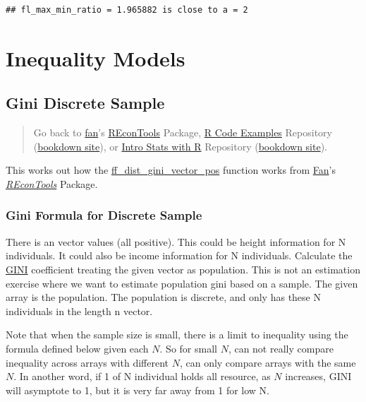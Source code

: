 \documentclass[
]{book}
\begin{document}
\begin{verbatim}
## fl_max_min_ratio = 1.965882 is close to a = 2
\end{verbatim}

\hypertarget{inequality-models}{%
\section{Inequality Models}\label{inequality-models}}

\hypertarget{gini-discrete-sample}{%
\subsection{Gini Discrete Sample}\label{gini-discrete-sample}}

\begin{quote}
Go back to \href{http://fanwangecon.github.io/}{fan}'s \href{https://fanwangecon.github.io/REconTools/}{REconTools} Package, \href{https://fanwangecon.github.io/R4Econ/}{R Code Examples} Repository (\href{https://fanwangecon.github.io/R4Econ/bookdown}{bookdown site}), or \href{https://fanwangecon.github.io/Stat4Econ/}{Intro Stats with R} Repository (\href{https://fanwangecon.github.io/Stat4Econ/bookdown}{bookdown site}).
\end{quote}

This works out how the \href{https://fanwangecon.github.io/REconTools/reference/ff_dist_gini_vector_pos.html}{ff\_dist\_gini\_vector\_pos} function works from \href{https://fanwangecon.github.io/}{Fan}'s \emph{\href{https://fanwangecon.github.io/REconTools/}{REconTools}} Package.

\hypertarget{gini-formula-for-discrete-sample}{%
\subsubsection{Gini Formula for Discrete Sample}\label{gini-formula-for-discrete-sample}}

There is an vector values (all positive). This could be height information for N individuals. It could also be income information for N individuals. Calculate the \href{https://en.wikipedia.org/wiki/Gini_coefficient}{GINI} coefficient treating the given vector as population. This is not an estimation exercise where we want to estimate population gini based on a sample. The given array is the population. The population is discrete, and only has these N individuals in the length n vector.

Note that when the sample size is small, there is a limit to inequality using the formula defined below given each \(N\). So for small \(N\), can not really compare inequality across arrays with different \(N\), can only compare arrays with the same \(N\). In another word, if 1 of N individual holds all resource, as \(N\) increases, GINI will asymptote to 1, but it is very far away from 1 for low N.
\end{document}
